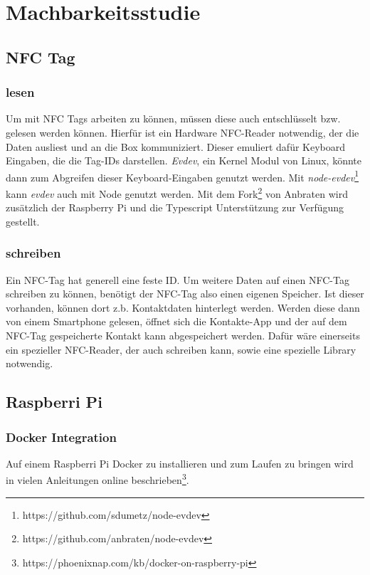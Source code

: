 \documentclass[10pt, a4paper]{article}
\begin{document}
\section{Machbarkeitsstudie}

\subsection{NFC Tag}
\subsubsection*{lesen}
Um mit NFC Tags arbeiten zu können, müssen diese auch entschlüsselt bzw. gelesen werden können.
Hierfür ist ein Hardware NFC-Reader notwendig, der die Daten ausliest und an die Box kommuniziert.
Dieser emuliert dafür Keyboard Eingaben, die die Tag-IDs darstellen.
\textit{Evdev}, ein Kernel Modul von Linux, könnte dann zum Abgreifen dieser Keyboard-Eingaben genutzt werden. Mit \textit{node-evdev}\footnote{https://github.com/sdumetz/node-evdev} kann \textit{evdev} auch mit Node genutzt werden. Mit dem Fork\footnote{https://github.com/anbraten/node-evdev} von Anbraten wird zusätzlich der Raspberry Pi und die Typescript Unterstützung zur Verfügung gestellt.

\subsubsection*{schreiben}
Ein NFC-Tag hat generell eine feste ID.
Um weitere Daten auf einen NFC-Tag schreiben zu können, benötigt der NFC-Tag also einen eigenen Speicher.
Ist dieser vorhanden, können dort z.b. Kontaktdaten hinterlegt werden. Werden diese dann von einem Smartphone gelesen, öffnet sich die Kontakte-App und der auf dem NFC-Tag gespeicherte Kontakt kann abgespeichert werden.
Dafür wäre einerseits ein spezieller NFC-Reader, der auch schreiben kann, sowie eine spezielle Library notwendig.

\subsection{Raspberri Pi}
\subsubsection{Docker Integration}
Auf einem Raspberri Pi Docker zu installieren und zum Laufen zu bringen wird in vielen Anleitungen online beschrieben\footnote{https://phoenixnap.com/kb/docker-on-raspberry-pi}.
\end{document}
